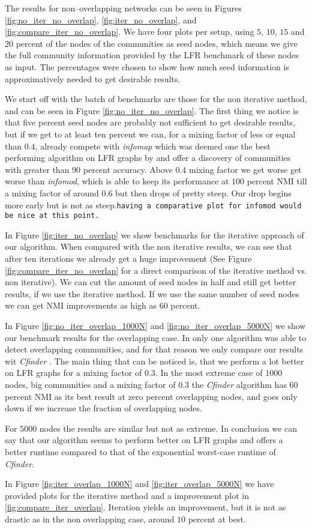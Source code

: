 The results for non--overlapping networks can be seen in Figures \ref{fig:no_iter_no_overlap}, \ref{fig:iter_no_overlap}, and \ref{fig:compare_iter_no_overlap}. We have four plots per setup, using $5$, $10$, $15$ and $20$ percent of the nodes of the communities as seed nodes, which means we give the full community information provided by the LFR benchmark of these nodes as input. The percentages were chosen to show how much seed information is approximatively needed to get desirable results.

We start off with the batch of benchmarks are those for the non iterative method, and can be seen in Figure \ref{fig:no_iter_no_overlap}. The first thing we notice is that five percent seed nodes are probably not sufficient to get desirable results, but if we get to at least ten percent we can, for a mixing factor of less or equal than $0.4$, already compete with \textit{infomap} which was deemed one the best performing algorithm on LFR graphs by \cite{LF09} and offer a discovery of communities with greater than $90$ percent accuracy. Above $0.4$ mixing factor we get worse get worse than \textit{infomod}, which is able to keep its performance at $100$ percent NMI till a mixing factor of around $0.6$ but then drops of pretty steep. Our drop begins more early but is not as steep.\texttt{having a comparative plot for infomod would be nice at this point.}

In Figure \ref{fig:iter_no_overlap} we show benchmarks for the iterative approach of our algorithm. When compared with the non iterative results, we can see that after ten iterations we already get a huge improvement (See Figure \ref{fig:compare_iter_no_overlap} for a direct comparison of the iterative method vs. non iterative). We can cut the amount of seed nodes in half and still get better results, if we use the iterative method. If we use the same number of seed nodes we can get NMI improvements as high as $60$ percent.

In Figure \ref{fig:no_iter_overlap_1000N} and \ref{fig:no_iter_overlap_5000N} we show our benchmark results for the overlapping case. In \cite{LF09} only one algorithm was able to detect overlapping communities, and for that reason we only compare our results wit \textit{Cfinder} \cite{PDFV05}. The main thing that can be noticed is, that we perform a lot better on LFR graphs for a mixing factor of $0.3$. In the most extreme case of $1000$ nodes, big communities and a mixing factor of $0.3$ the \textit{Cfinder} algorithm has $60$ percent NMI as its best result at zero percent overlapping nodes, and goes only down if we increase the fraction of overlapping nodes.

For $5000$ nodes the results are similar but not as extreme. In conclusion we can say that our algorithm seems to perform better on LFR graphs and offers a better runtime compared to that of the exponential worst-case runtime of \textit{Cfinder}.

In Figure \ref{fig:iter_overlap_1000N} and \ref{fig:iter_overlap_5000N} we have provided plots for the iterative method and a improvement plot in \ref{fig:compare_iter_overlap}. Iteration yields an improvement, but it is not as drastic as in the non overlapping case, around $10$ percent at best.